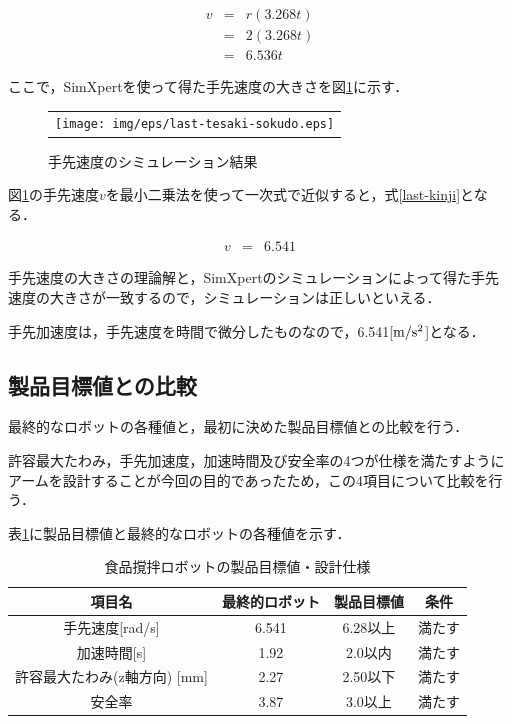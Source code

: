 \begin{eqnarray}
  v &=& r(3.268t) \nonumber \\
    &=& 2(3.268t) \nonumber \\
    &=& 6.536t
  \label{hand-velocity}
\end{eqnarray}

ここで，SimXpertを使って得た手先速度の大きさを図\ref{last-tesaki-sokudo}に示す．

\begin{figure}[htbp]
  \begin{center}
    \begin{tabular}{c}
      \texttt{[image: img/eps/last-tesaki-sokudo.eps]}
    \end{tabular}
    \caption{手先速度のシミュレーション結果}
    \label{last-tesaki-sokudo}
  \end{center}
\end{figure}

図\ref{last-tesaki-sokudo}の手先速度\(v\)を最小二乗法を使って一次式で近似すると，式\ref{last-kinji}となる．

\begin{eqnarray}
  v &=&  6.541
  \label{last-kinji}
\end{eqnarray}

手先速度の大きさの理論解と，SimXpertのシミュレーションによって得た手先速度の大きさが一致するので，シミュレーションは正しいといえる．

手先加速度は，手先速度を時間で微分したものなので，6.541{[}\(\rm m/s^2\){]}となる．

\subsection{製品目標値との比較}\label{ux88fdux54c1ux76eeux6a19ux5024ux3068ux306eux6bd4ux8f03}

最終的なロボットの各種値と，最初に決めた製品目標値との比較を行う．

許容最大たわみ，手先加速度，加速時間及び安全率の4つが仕様を満たすようにアームを設計することが今回の目的であったため，この4項目について比較を行う．

表\ref{last-spec}に製品目標値と最終的なロボットの各種値を示す．

\begin{table}[htb]
\caption[]{食品撹拌ロボットの製品目標値・設計仕様}
  \begin{center}
    \begin{tabular}{|c|c|c|c|} \hline
      項目名 & 最終的ロボット & 製品目標値 & 条件\\ \hline \hline
      手先速度[rad/s] & 6.541 & 6.28以上 & 満たす \\ \hline
      加速時間[s] & 1.92 & 2.0以内 & 満たす\\ \hline
      許容最大たわみ(z軸方向) [mm] & 2.27 & 2.50以下 & 満たす\\ \hline
      安全率 & 3.87 & 3.0以上 &満たす\\ \hline
    \end{tabular}
    \label{last-spec}
  \end{center}
\end{table}

